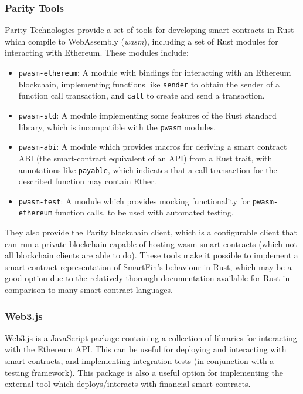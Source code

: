 \subsubsection{Parity Tools} \label{parity-tools}

Parity Technologies provide a set of tools for developing smart contracts in Rust which compile to WebAssembly (\textit{wasm}), including a set of Rust modules for interacting with Ethereum\cite{parity-technologies}. These modules include:

\begin{itemize}
    \item \texttt{pwasm-ethereum}: A module with bindings for interacting with an Ethereum blockchain, implementing functions like \texttt{sender} to obtain the sender of a function call transaction, and \texttt{call} to create and send a transaction\cite{pwasm-ethereum}.
    \item \texttt{pwasm-std}: A module implementing some features of the Rust standard library, which is incompatible with the \texttt{pwasm} modules\cite{pwasm-std}.
    \item \texttt{pwasm-abi}: A module which provides macros for deriving a smart contract ABI (the smart-contract equivalent of an API) from a Rust trait, with annotations like \texttt{payable}, which indicates that a call transaction for the described function may contain Ether\cite{pwasm-abi}.
    \item \texttt{pwasm-test}: A module which provides mocking functionality for \texttt{pwasm-ethereum} function calls, to be used with automated testing\cite{pwasm-test}. \\
\end{itemize}

They also provide the Parity blockchain client, which is a configurable client that can run a private blockchain capable of hosting wasm smart contracts (which not all blockchain clients are able to do)\cite{pwasm-client-wasm}. These tools make it possible to implement a smart contract representation of SmartFin's behaviour in Rust, which may be a good option due to the relatively thorough documentation available for Rust in comparison to many smart contract languages.


\subsubsection{Web3.js}

Web3.js is a JavaScript package containing a collection of libraries for interacting with the Ethereum API\cite{web3-intro}. This can be useful for deploying and interacting with smart contracts, and implementing integration tests (in conjunction with a testing framework). This package is also a useful option for implementing the external tool which deploys/interacts with financial smart contracts.


